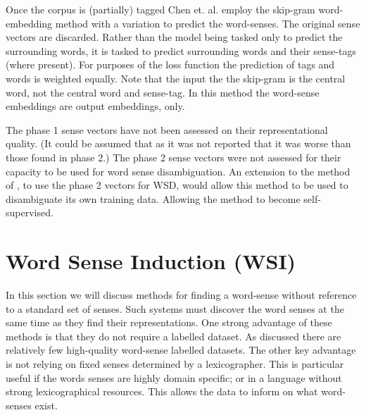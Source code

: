 \documentclass[12pt,parskip]{komatufte}
\begin{document}
Once the corpus is (partially) tagged Chen et. al. employ the skip-gram word-embedding method with a variation to predict the word-senses.
The original sense vectors are discarded.
Rather than the model being tasked only to predict the surrounding words, it is tasked to predict surrounding words and their sense-tags (where present).
For purposes of the loss function the prediction of tags and words is weighted equally.
Note that the input the the skip-gram is the central word, not the central word and sense-tag.
In this method the word-sense embeddings are output embeddings, only.

The phase 1 sense vectors have not been assessed on their representational quality.
(It could be assumed that as it was not reported that it was worse than those found in phase 2.)
The phase 2 sense vectors were not assessed for their capacity to be used for word sense disambiguation.
An extension to the method of \textcite{Chen2014}, to use the phase 2 vectors for WSD, would allow this method to be used to disambiguate its own training data.
Allowing the method to become self-supervised.


\section{Word Sense Induction (WSI)}



In this section we will discuss methods for finding a word-sense without reference to a standard set of senses.
Such systems must discover the word senses at the same time as they find their representations.
One strong advantage of these methods is that they do not require a labelled dataset.
As discussed there are relatively few high-quality word-sense labelled datasets.
The other key advantage is not relying on fixed senses determined by a lexicographer.
This is particular useful if the words senses are highly domain specific;
or in a language without strong lexicographical resources.
This allows the data to inform on what word-senses exist.
\end{document}
